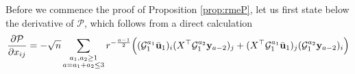 \documentclass[12pt]{article}
\numberwithin{equation}{section}
\theoremstyle{remark}
\newcommand{\1}{{\rm 1}\kern-0.24em{\rm I}}
\begin{document}
\begin{appendices}
 Before we commence the proof of Proposition  \ref{prop:rmeP},  let us first state below  the derivative of $\mathcal{P}$,  which follows from a direct calculation
 \begin{align}\label{eq:deri_P}
  \frac{\partial \mathcal{P}}{\partial x_{ij}}  
&= -\sqrt n\sum_{\begin{subarray}{c} a_1, a_2\geq 1\\ a=a_1+a_2\leq 3\end{subarray}}  r^{-\frac{a-1}{2}}\Big((\mathcal{G}_1^{a_1}\bar{\bf u}_1)_{i} ({X}^{\top}\mathcal{G}_1^{a_2} {\bf y}_{a-2})_j +  ({X}^{\top}\mathcal{G}_1^{a_1}\bar{\bf u}_1)_{j} (\mathcal{G}_1^{a_2} {\bf y}_{a-2})_i   \Big)\notag\\

\end{align}
\end{appendices}
\end{document}
